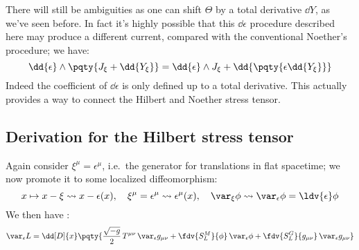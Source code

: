 \documentclass[a4paper
	,10pt
]{article}
\begin{document}
	\newparagraph
	There will still be ambiguities as one can shift $\Theta$ by a total derivative $\dd{Y}$, as we've seen before. In fact it's highly possible that this $\dd{\epsilon}$ procedure described here may produce a different current, compared with the conventional Noether's procedure; we have:
	\begin{equation}
		\dd{\epsilon} \wedge
			\pqty{J_\xi + \dd{Y_\xi}}
		= \dd{\epsilon} \wedge J_\xi
			+ \dd{\pqty{
				\epsilon \dd{Y_\xi}
			}}
	\end{equation}
	Indeed the coefficient of $\dd{\epsilon}$ is only defined up to a total derivative. 
	This actually provides a way to connect the Hilbert and Noether stress tensor. 
	
\subsection{Derivation for the Hilbert stress tensor}
	Again consider $\xi^\mu = \epsilon^\mu$, i.e.~the generator for translations in flat spacetime; we now promote it to some localized diffeomorphism:
	\begin{equation}
		x\mapsto x - \xi \leadsto x - \epsilon(x),
	\quad
		\xi^\mu = \epsilon^\mu
		\leadsto \epsilon^\mu(x),
	\quad
		\var_\xi \phi
		\leadsto \var_\epsilon \phi
		= \ldv{\epsilon} \phi
	\end{equation}
	We then have \cite{Compere:2018aar}:
	\begin{equation}
	\begin{aligned}
		\var_\epsilon L
		&= \dd[D]{x} \pqty{
				\frac{\sqrt{-g}}{2}\, T^{\mu\nu}\,
					\var_\epsilon {g_{\mu\nu}}
				+ \fdv{S^M_L}{\phi}\,
					\var_\epsilon {\phi}
				+ \fdv{S^G_L}{g_{\mu\nu}}\,
					\var_\epsilon {g_{\mu\nu}}
			} \\
	\end{aligned}
	\end{equation}
	
	
	
	
	
	
\vspace{1.2\baselineskip}
\pagebreak[4]
\raggedright
\printbibliography[%
	,heading = bibintoc
]
\end{document}
